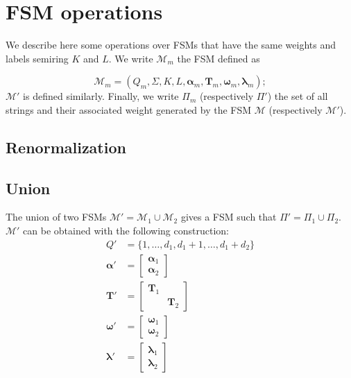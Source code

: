 \section{FSM operations}
\label{sec:fsmops}

We describe here some operations over FSMs that have the same weights and labels
semiring $K$ and $L$. We write $\mathcal{M}_m$ the FSM defined as

\begin{equation}
    \mathcal{M}_m = (Q_m, \Sigma, K, L, \boldsymbol{\alpha}_m,
        \mathbf{T}_m, \boldsymbol{\omega}_m, \boldsymbol{\lambda}_m);
\end{equation}
$\mathcal{M}'$ is defined similarly. Finally, we write $\Pi_m$ (respectively
$\Pi'$) the set of all strings and their associated weight generated by the FSM
$\mathcal{M}$ (respectively $\mathcal{M}'$).

\subsection{Renormalization}

\subsection{Union}

The union of two FSMs $\mathcal{M}' = \mathcal{M}_1 \cup \mathcal{M}_2$ gives
a FSM such that $\Pi' = \Pi_1 \cup \Pi_2$. $\mathcal{M}'$ can be obtained with
the following construction:
\begin{align}
    Q' &= \{1, \dots, d_1, d_1 + 1, \dots, d_1 + d_2 \} \\
    \boldsymbol{\alpha}' &= \begin{bmatrix}
        \boldsymbol{\alpha}_1 \\
        \boldsymbol{\alpha}_2
    \end{bmatrix} \\
    \mathbf{T}' &= \begin{bmatrix}
        \mathbf{T}_1 & \\
        & \mathbf{T}_2
    \end{bmatrix} \\
    \boldsymbol{\omega}' &= \begin{bmatrix}
        \boldsymbol{\omega}_1 \\
        \boldsymbol{\omega}_2
    \end{bmatrix}\\
    \boldsymbol{\lambda}' &= \begin{bmatrix}
        \boldsymbol{\lambda}_1 \\
        \boldsymbol{\lambda}_2
    \end{bmatrix}
\end{align}


